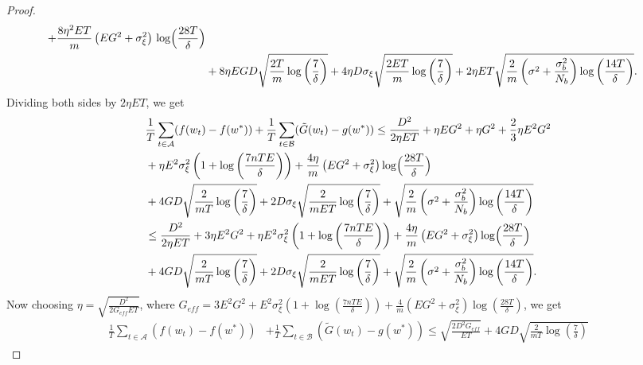 \documentclass{article} %
\def\A{{\mathcal A}}
\def\B{{\mathcal B}}
\begin{document}
\begin{proof}
\begin{equation*}
\begin{aligned}
        + \frac{8\eta^2 E T}{m}\,\bigl(EG^2+\sigma_\xi^2\bigr)\,
        \log \Bigl(\frac{28T}{\delta}\Bigr) 
        \\
        & + 8\eta E G D \sqrt{\frac{2T}{{m}}\log\left(\frac{7}{\delta}\right)} + 4\eta D\sigma_\xi\sqrt{\frac{2ET}{{m}}\log\left(\frac{7}{\delta}\right)} +  2\eta E T \sqrt{\frac{2}{m}\left({\sigma^2} + \frac{\sigma^2_b}{N_b}\right) \log\left(\frac{14T}{\delta}\right)}.
    \end{aligned}
    \end{equation*}
    Dividing both sides by $2\eta E T$, we get
    \begin{equation*}
    \begin{aligned}
        &\frac{1}{T}\sum_{t \in \A}(f(w_t) - f(w^*) ) + \frac{1}{T}\sum_{t \in \B} (\tilde{G}(w_t) - g(w^*)) \leq \frac{D^2}{2\eta E T} + \eta E G^2  + \eta G^2 + \frac{2}{3} \eta E^2G^2 
        \\
        &+\eta E^2 \sigma_\xi^2\left(1 + \log\left(\frac{7nTE}{\delta}\right)\right)
        + \frac{4\eta}{m}\,\bigl(EG^2+\sigma_\xi^2\bigr)
        \log \Bigl(\frac{28T}{\delta}\Bigr)
        \\
        & + 4 GD \sqrt{\frac{2}{{mT}}\log\left(\frac{7}{\delta}\right)} + 2 D \sigma_\xi \sqrt{\frac{2}{mET}\log\left(\frac{7}{\delta}\right)} + \sqrt{\frac{2}{m}\left({\sigma^2} + \frac{\sigma^2_b}{N_b}\right) \log\left(\frac{14T}{\delta}\right)}
        \\
        &\leq \frac{D^2}{2\eta E T} + 3\eta E^2 G^2 +\eta E^2 \sigma_\xi^2\left(1 + \log\left(\frac{7nTE}{\delta}\right)\right) + \frac{4\eta}{m}\,\bigl(EG^2+\sigma_\xi^2\bigr)
        \log \Bigl(\frac{28T}{\delta}\Bigr)
        \\
        & + 4 GD \sqrt{\frac{2}{{mT}}\log\left(\frac{7}{\delta}\right)} + 2 D \sigma_\xi \sqrt{\frac{2}{mET}\log\left(\frac{7}{\delta}\right)} + \sqrt{\frac{2}{m}\left({\sigma^2} + \frac{\sigma^2_b}{N_b}\right) \log\left(\frac{14T}{\delta}\right)}.
    \end{aligned}
    \end{equation*}
    Now choosing $\eta = \sqrt{\frac{D^2}{2G_{eff} E T}}$, where $G_{eff} = 3 E^{2} G^{2}+ E^{2} \sigma_{\xi}^{2} \left(1 + \log\left(\frac{7 n T E}{\delta}\right)\right)+ \frac{4}{m}(EG^{2}+\sigma_{\xi}^{2}) \log\left(\frac{28 T}{\delta}\right)$, we get
    \begin{equation*}
    \begin{aligned}
        \frac{1}{T}\sum_{t\in \A}(f(w_t) - f(w^*) ) &+ \frac{1}{T}\sum_{t\in \B}(\tilde{G}(w_t) - g(w^*)) \leq \sqrt{\frac{{2 D^2 G_{eff}}}{{E T}}} + 4 G D \sqrt{\frac{2}{{mT}}\log\left(\frac{7}{\delta}\right)}

\end{aligned}
\end{equation*}
\end{proof}
\end{document}
